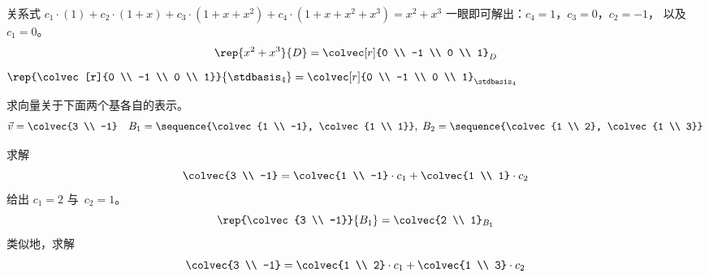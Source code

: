 \begin{exercises}
\begin{answer}
\begin{exparts}
\begin{equation*}
          \end{equation*}
        \partsitem 关系式
           $c_1\cdot(1)+c_2\cdot(1+x)+c_3\cdot(1+x+x^2)+c_4\cdot(1+x+x^2+x^3)
             =x^2+x^3$
           一眼即可解出：$c_4=1$，$c_3=0$，$c_2=-1$，
           以及 $c_1=0$。
            \begin{equation*}
               \rep{x^2+x^3}{D}=\colvec[r]{0 \\ -1 \\ 0 \\ 1}_D
            \end{equation*}
        \partsitem \( \rep{\colvec[r]{0 \\ -1 \\ 0 \\ 1}}{\stdbasis_4}
                     =\colvec[r]{0 \\ -1 \\ 0 \\ 1}_{\stdbasis_4} \)
      \end{exparts}
    \end{answer}
  \item  求向量关于下面两个基各自的表示。
    \begin{equation*}
      \vec{v}=\colvec{3  \\ -1}
      \quad
      B_1=\sequence{\colvec{1  \\ -1}, \colvec{1  \\ 1}},\;
      B_2=\sequence{\colvec{1 \\ 2}, \colvec{1 \\ 3}}
    \end{equation*}
    \begin{answer}
       求解
      \begin{equation*}
        \colvec{3 \\ -1}=\colvec{1 \\ -1}\cdot c_1
                         +\colvec{1 \\ 1}\cdot c_2
      \end{equation*}
      给出 $c_1=2$ 与~$c_2=1$。
      \begin{equation*}
        \rep{\colvec{3 \\ -1}}{B_1}
           =\colvec{2 \\ 1}_{B_1}
      \end{equation*}
      类似地，求解
      \begin{equation*}
        \colvec{3 \\ -1}=\colvec{1 \\ 2}\cdot c_1
                         +\colvec{1 \\ 3}\cdot c_2

\end{equation*}
\end{answer}
\end{exercises}
